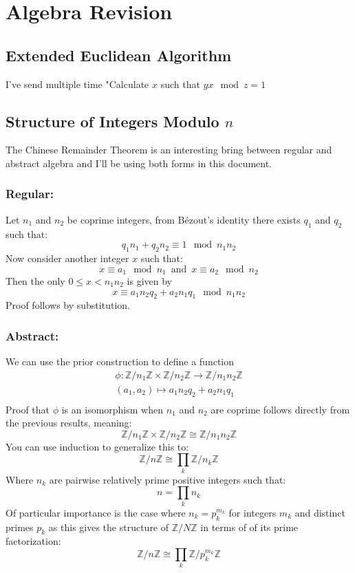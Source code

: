 
\section{Algebra Revision}
\subsection{Extended Euclidean Algorithm}
I've send multiple time "Calculate $x$ such that $yx \mod z = 1$

\subsection{Structure of Integers Modulo $n$}
The Chinese Remainder Theorem is an interesting bring between regular and abstract algebra and I'll be using both forms in this document.

\subsubsection{Regular:}
Let $n_1$ and $n_2$ be coprime integers,
from Bézout's identity there exists $q_1$ and $q_2$ such that:
\[q_1n_1+q_2n_2 \equiv 1\mod n_1n_2\]
Now consider another integer $x$ such that:
\[x\equiv a_1 \mod n_1\, \text{ and }\, x\equiv a_2\mod n_2 \]
Then the only $0\leq x < n_1n_2$ is given by
\[x \equiv a_1n_2q_2+a_2n_1q_1\mod n_1n_2\]
Proof follows by substitution.

\subsubsection{Abstract:}
We can use the prior construction to define a function 
\[\begin{matrix}
\phi:\mathbb{Z}/n_1\mathbb{Z}\times\mathbb{Z}/n_2\mathbb{Z} \rightarrow \mathbb{Z}/n_1n_2\mathbb{Z}\\
(a_1,a_2)\mapsto a_1n_2q_2+a_2n_1q_1\\
\end{matrix}\]
Proof that $\phi$ is an isomorphism when $n_1$ and $n_2$ are coprime follows directly from the previous results, meaning:
\[\mathbb{Z}/n_1\mathbb{Z}\times\mathbb{Z}/n_2\mathbb{Z} \cong \mathbb{Z}/n_1n_2\mathbb{Z}\]
You can use induction to generalize this to:
\[\mathbb{Z}/n\mathbb{Z} \cong \prod_k\mathbb{Z}/n_k\mathbb{Z}\]
Where $n_k$ are pairwise relatively prime positive integers such that:
\[n =\prod_k n_k \]
Of particular importance is the case where $n_k = p_k^{m_k}$ for integers $m_k$ and distinct primes $p_k$ as this gives the structure of $\mathbb{Z}/N\mathbb{Z}$ in terms of of its prime factorization:
\[\mathbb{Z}/n\mathbb{Z} \cong \prod_k\mathbb{Z}/p_k^{m_k}\mathbb{Z}\]

